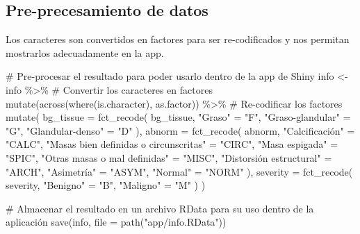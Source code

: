 \documentclass[
]{article}
\newenvironment{Shaded}{\begin{snugshade}}{\end{snugshade}}
\newcommand{\AttributeTok}[1]{\textcolor[rgb]{0.00,0.34,0.68}{#1}}
\newcommand{\CommentTok}[1]{\textcolor[rgb]{0.54,0.53,0.53}{#1}}
\newcommand{\FunctionTok}[1]{\textcolor[rgb]{0.39,0.29,0.61}{#1}}
\newcommand{\NormalTok}[1]{\textcolor[rgb]{0.12,0.11,0.11}{#1}}
\newcommand{\OtherTok}[1]{\textcolor[rgb]{0.00,0.43,0.16}{#1}}
\newcommand{\SpecialCharTok}[1]{\textcolor[rgb]{0.24,0.68,0.91}{#1}}
\newcommand{\StringTok}[1]{\textcolor[rgb]{0.75,0.01,0.01}{#1}}
\begin{document}
\hypertarget{pre-precesamiento-de-datos}{%
\subsection{Pre-precesamiento de
datos}\label{pre-precesamiento-de-datos}}

Los caracteres son convertidos en factores para ser re-codificados y nos
permitan mostrarlos adecuadamente en la app.

\begin{Shaded}
\begin{Highlighting}[]
\CommentTok{\# Pre{-}procesar el resultado para poder usarlo dentro de la app de Shiny}
\NormalTok{info }\OtherTok{\textless{}{-}}\NormalTok{ info }\SpecialCharTok{\%\textgreater{}\%}
  \CommentTok{\# Convertir los caracteres en factores}
  \FunctionTok{mutate}\NormalTok{(}\FunctionTok{across}\NormalTok{(}\FunctionTok{where}\NormalTok{(is.character), as.factor)) }\SpecialCharTok{\%\textgreater{}\%}
  \CommentTok{\# Re{-}codificar los factores}
  \FunctionTok{mutate}\NormalTok{(}
    \AttributeTok{bg\_tissue =} \FunctionTok{fct\_recode}\NormalTok{(}
\NormalTok{      bg\_tissue,}
      \StringTok{"Graso"} \OtherTok{=} \StringTok{"F"}\NormalTok{,}
      \StringTok{"Graso{-}glandular"} \OtherTok{=} \StringTok{"G"}\NormalTok{,}
      \StringTok{"Glandular{-}denso"} \OtherTok{=} \StringTok{"D"}
\NormalTok{    ),}
    \AttributeTok{abnorm =} \FunctionTok{fct\_recode}\NormalTok{(}
\NormalTok{      abnorm,}
      \StringTok{"Calcificación"} \OtherTok{=} \StringTok{"CALC"}\NormalTok{,}
      \StringTok{"Masas bien definidas o circunscritas"} \OtherTok{=} \StringTok{"CIRC"}\NormalTok{,}
      \StringTok{"Masa espigada"} \OtherTok{=} \StringTok{"SPIC"}\NormalTok{,}
      \StringTok{"Otras masas o mal definidas"} \OtherTok{=} \StringTok{"MISC"}\NormalTok{,}
      \StringTok{"Distorsión estructural"} \OtherTok{=} \StringTok{"ARCH"}\NormalTok{,}
      \StringTok{"Asimetría"} \OtherTok{=} \StringTok{"ASYM"}\NormalTok{,}
      \StringTok{"Normal"} \OtherTok{=} \StringTok{"NORM"}
\NormalTok{    ),}
    \AttributeTok{severity =} \FunctionTok{fct\_recode}\NormalTok{(}
\NormalTok{      severity,}
      \StringTok{"Benigno"} \OtherTok{=} \StringTok{"B"}\NormalTok{,}
      \StringTok{"Maligno"} \OtherTok{=} \StringTok{"M"}
\NormalTok{    )}
\NormalTok{  )}

\CommentTok{\# Almacenar el resultado en un archivo RData para su uso dentro de la aplicación}
\FunctionTok{save}\NormalTok{(info, }\AttributeTok{file =} \FunctionTok{path}\NormalTok{(}\StringTok{"app/info.RData"}\NormalTok{))}
\end{Highlighting}
\end{Shaded}
\end{document}
